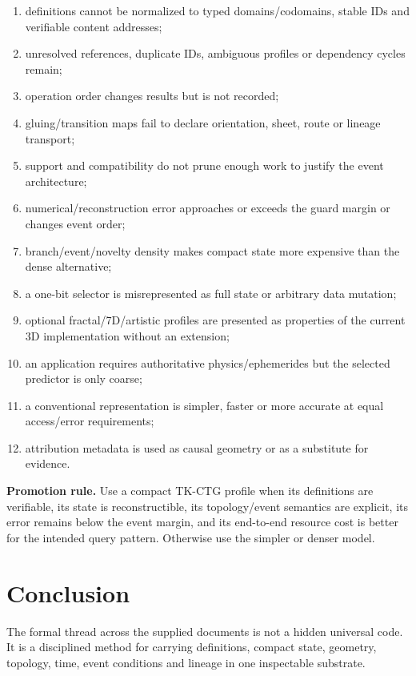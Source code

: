 \documentclass[10pt,a4paper]{article}
\begin{document}
\begin{enumerate}
  \item definitions cannot be normalized to typed domains/codomains, stable IDs and verifiable content addresses;
  \item unresolved references, duplicate IDs, ambiguous profiles or dependency cycles remain;
  \item operation order changes results but is not recorded;
  \item gluing/transition maps fail to declare orientation, sheet, route or lineage transport;
  \item support and compatibility do not prune enough work to justify the event architecture;
  \item numerical/reconstruction error approaches or exceeds the guard margin or changes event order;
  \item branch/event/novelty density makes compact state more expensive than the dense alternative;
  \item a one-bit selector is misrepresented as full state or arbitrary data mutation;
  \item optional fractal/7D/artistic profiles are presented as properties of the current 3D implementation without an extension;
  \item an application requires authoritative physics/ephemerides but the selected predictor is only coarse;
  \item a conventional representation is simpler, faster or more accurate at equal access/error requirements;
  \item attribution metadata is used as causal geometry or as a substitute for evidence.
\end{enumerate}

\begin{decisionbox}
\textbf{Promotion rule.} Use a compact TK-CTG profile when its definitions are verifiable, its state is reconstructible, its topology/event semantics are explicit, its error remains below the event margin, and its end-to-end resource cost is better for the intended query pattern. Otherwise use the simpler or denser model.
\end{decisionbox}

\section{Conclusion}
\label{sec:conclusion}

The formal thread across the supplied documents is not a hidden universal code. It is a disciplined method for carrying definitions, compact state, geometry, topology, time, event conditions and lineage in one inspectable substrate.
\end{document}
